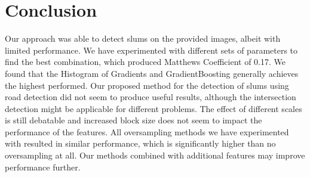 \section{Conclusion}

Our approach was able to detect slums on the provided images, albeit with limited performance. We have experimented with different sets of parameters to find the best combination, which produced Matthews Coefficient of 0.17. We found that the Histogram of Gradients and GradientBoosting generally achieves the highest performed. Our proposed method for the detection of slums using road detection did not seem to produce useful results, although the intersection detection might be applicable for different problems. The effect of different scales is still debatable and increased block size does not seem to impact the performance of the features. All oversampling methods we have experimented with resulted in similar performance, which is significantly higher than no oversampling at all. Our methods combined with additional  features may improve performance further.










%
